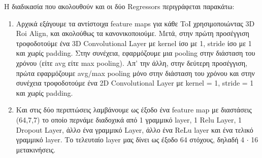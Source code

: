 Η διαδικασία που ακολουθούν και οι δύο \en Regressors \gr περιγράφεται παρακάτω:
\begin{enumerate}
\item Αρχικά εξάγουμε τα αντίστοιχα \en feature maps \gr για κάθε \en ToI \gr χρησιμοποιώντας \en 3D Roi Align\gr, και ακολούθως τα κανονικοποιούμε. Μετά, στην πρώτη προσέγγιση
τροφοδοτούμε ένα \en 3D Convolutional Layer \gr με \en  kernel \gr ίσο με 1, \en stride \gr ίσο με 1 και χωρίς \en padding\gr. Στην συνέχεια, εφαρμόζουμε μια
\en pooling  στην διάσταση του χρόνου (είτε \en avg \gr είτε \en max pooling\gr). Απ'   την άλλη, στην δεύτερη προσέγγιση, πρώτα εφαρμόζουμε \en avg/max pooling \gr μόνο στην
διάσταση του χρόνου και στην συνέχεια τροφοδοτούμε ένα \en 2D Convolutional Layer \gr με \en kernel = 1, stride = 1 \gr και χωρίς \en padding\gr.
\item Και στις δύο περιπτώσεις λαμβάνουμε ως έξοδο ένα \en feature map \gr με διαστάσεις (64,7,7) το οποίο περνάμε διαδοχικά από 1 γραμμικό  \en layer, 1 Relu Layer, 1 Dropout Layer, \gr
  άλλο ένα γραμμικό \en Layer\gr, άλλο ένα \en ReLu layer \gr και ένα τελικό γραμμικό \en layer\gr. Το τελευταίο \en layer \gr μας δίνει ως έξοδο 64 στόχους, δηλαδή 4 $\cdot$ 16 μετακινήσεις.
\end{enumerate}

